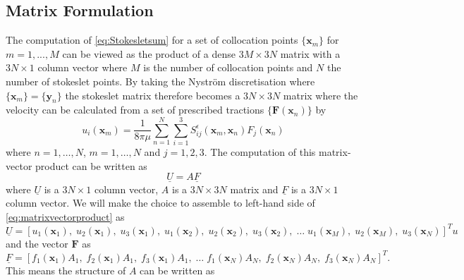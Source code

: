 \subsection{Matrix Formulation} \label{subsec:MatrixForm}
The computation of \cref{eq:Stokesletsum} for a set of collocation points $\{\bm{x}_m\}$  for $m = 1,...,M$ can be viewed as the product of a dense $3M \times 3N$ matrix with a $3N \times 1$ column vector where $M$ is the number of collocation points and $N$ the number of stokeslet points. By taking the Nyström discretisation \cite{Nystrom1930UberRandwertaufgaben} where $\{\bm{x}_m\} = \{\bm{y}_n\}$ the stokeslet matrix therefore becomes a $3N \times 3N$ matrix where the velocity can be calculated from a set of prescribed tractions $\{\bm{F}(\bm{x}_n)\}$ by
\begin{equation}
\label{eq:Nystrom}
    u_{i}\left(\bm{x}_m\right)=\frac{1}{8 \pi \mu} \sum_{n=1}^{N} \sum_{i=1}^{3} S_{i j}^{\epsilon}\left(\bm{x}_m, {\bm{x}}_{n}\right) {F}_{j}({\bm{x}}_{n})
\end{equation}
where $n=1,\dots,N$, $m=1,\dots,N$ and $j=1,2,3$. The computation of this matrix-vector product can be written as 
\begin{equation}
\label{eq:matrixvectorproduct}
    \underline{U} = A \underline{F}
\end{equation}
where $\underline{U}$ is a $3N \times 1$ column vector, $A$ is a $3N \times 3N$ matrix and $\underline{F}$ is a $3N \times 1$ column vector. We will make the choice to assemble to left-hand side of \cref{eq:matrixvectorproduct} as
\small
\begin{equation*}
    \underline{U} = [u_1({\bm{x}}_{1}), \; u_2({\bm{x}}_{1}), \; u_3({\bm{x}}_{1}), \; u_1({\bm{x}}_{2}), \; u_2({\bm{x}}_{2}), \; u_3({\bm{x}}_{2}), \; \dots \; u_1({\bm{x}}_{M}), \; u_2({\bm{x}}_{M}), \; u_3({\bm{x}}_{N})]^{T}u
\end{equation*}
\normalsize
and the vector $\bm{F}$ as
\small
\begin{equation*}
    \underline{F} = [{f}_{1}({\bm{x}}_{1})A_1, \; {f}_{2}({\bm{x}}_{1})A_1, \; {f}_{3}({\bm{x}}_{1})A_1,\; \dots \; {f}_{1}({\bm{x}}_{N})A_N, \; {f}_{2}({\bm{x}}_{N})A_N, \; f_{3}({\bm{x}}_{N})A_N]^{T}.
\end{equation*}
\normalsize
This means the structure of $A$ can be written as
\small
